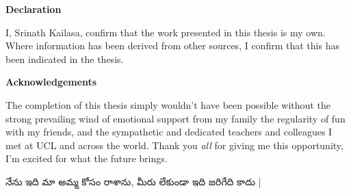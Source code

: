 \thispagestyle{plain}

\begin{center}
    \textbf{Declaration}
\end{center}
I, Srinath Kailasa, confirm that the work presented in this thesis is my own. Where information has been derived from other sources, I confirm that this has been indicated in the thesis.


\begin{center}
    \textbf{Acknowledgements}
\end{center}

The completion of this thesis simply wouldn't have been possible without the strong prevailing wind of emotional support from my family the regularity of fun with my friends, and the sympathetic and dedicated teachers and colleagues I met at UCL and across the world. Thank you \textit{all} for giving me this opportunity, I'm excited for what the future brings.

\begin{center}
   {\tel నేను ఇది మా అమ్మ కోసం రాశాను, మీరు లేకుండా ఇది జరిగేది కాదు |}
\end{center}